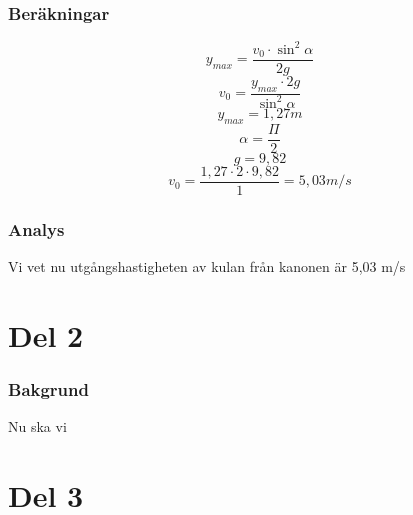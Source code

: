 \documentclass[11p]{article}
\begin{document}
        \subsubsection{Beräkningar}
            \begin{equation}
                y_{max}=\frac{v_0 \cdot \sin^2 \alpha}{2g}
                \label{eq:eq1}
            \end{equation}
            \begin{equation}
                v_0=\frac{y_{max} \cdot 2g}{\sin^2 \alpha}
                \label{eq:eq2}
            \end{equation}
            \begin{equation}
                y_{max}=1,27 m
                \label{eq:eq3}
            \end{equation}
            \begin{equation}
                \alpha=\frac{\Pi}{2}
                \label{eq:eq4}
            \end{equation}
            \begin{equation}
                g=9,82
                \label{eq:eq5}
            \end{equation}
            \begin{equation}
                v_0=\frac{1,27 \cdot 2 \cdot 9,82}{1}=5,03 m/s
                \label{eq:eq6}
            \end{equation}
        \subsubsection{Analys}
            Vi vet nu utgångshastigheten av kulan från kanonen är 5,03 m/s

    \section{Del 2}
        \subsubsection{Bakgrund}
            Nu ska vi
    \section{Del 3}

\end{document}

